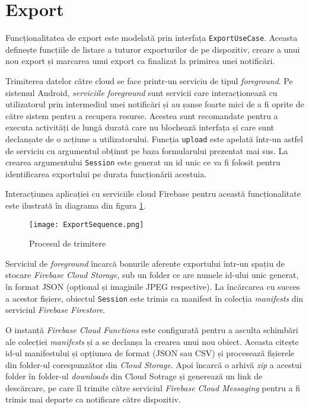 \section{Export}

Funcționalitatea de export este modelată prin interfața \texttt{ExportUseCase}. Aceasta definește funcțiile de listare a tuturor exporturilor de pe dispozitiv, creare a unui nou export și marcarea unui export ca finalizat la primirea unei notificări.



Trimiterea datelor către cloud se face printr-un serviciu de tipul \emph{foreground}. Pe sistemul Android, \emph{serviciile foreground} sunt servicii care interacționează cu utilizatorul prin intermediul unei notificări și au șanse foarte mici de a fi oprite de către sistem pentru a recupera resurse. Acestea sunt recomandate pentru a executa activități de lungă durată care nu blochează interfața și care sunt declanșate de o acțiune a utilizatorului. Funcția \texttt{upload} este apelată într-un astfel de serviciu cu argumentul obținut pe baza formularului prezentat mai sus. La crearea argumentului \texttt{Session} este generat un id unic ce va fi folosit pentru identificarea exportului pe durata funcționării acestuia.

Interacțiunea aplicației cu serviciile cloud Firebase pentru această funcționalitate este ilustrată în diagrama din figura \ref{exportProcess}.

\begin{figure}[ht]
  \centering
  \texttt{[image: ExportSequence.png]}
  \caption{Procesul de trimitere}
  \label{exportProcess}
\end{figure}

Serviciul de \emph{foreground} încarcă bonurile aferente exportului într-un spațiu de stocare \emph{Firebase Cloud Storage}, sub un folder ce are numele id-ului unic generat, în format JSON (opțional și imaginile JPEG respective). La încărcarea cu succes a acestor fișiere, obiectul \texttt{Session} este trimis ca manifest în colecția \emph{manifests} din serviciul \emph{Firebase Firestore}.

O instanță \emph{Firebase Cloud Functions} este configurată pentru a asculta schimbări ale colecției \emph{manifests} și a se declanșa la crearea unui nou obiect. Aceasta citește id-ul manifestului și opțiunea de format (JSON sau CSV) și procesează fișierele din folder-ul corespunzător din \emph{Cloud Storage}. Apoi încarcă o arhivă \emph{zip} a acestui folder în folder-ul \emph{downloads} din Cloud Sotrage și generează un link de descărcare, pe care îl trimite către serviciul \emph{Firebase Cloud Messaging} pentru a fi trimis mai departe ca notificare către dispozitiv.

